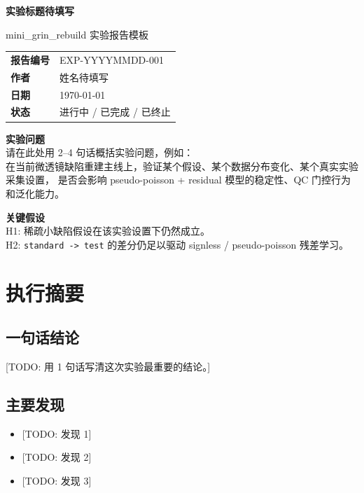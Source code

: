 \documentclass[UTF8,a4paper,11pt]{ctexart}
\newcommand{\ReportTitle}{实验标题待填写}
\newcommand{\ReportID}{EXP-YYYYMMDD-001}
\newcommand{\AuthorName}{姓名待填写}
\newcommand{\ReportDate}{\today}
\newcommand{\ExperimentStatus}{进行中 / 已完成 / 已终止}
\newcommand{\ProblemStatement}{%
请在此处用 2--4 句话概括实验问题，例如：\\
在当前微透镜缺陷重建主线上，验证某个假设、某个数据分布变化、某个真实实验采集设置，
是否会影响 pseudo-poisson + residual 模型的稳定性、QC 门控行为和泛化能力。%
}
\newcommand{\KeyHypothesis}{%
H1: 稀疏小缺陷假设在该实验设置下仍然成立。\\
H2: \Code{standard -> test} 的差分仍足以驱动 signless / pseudo-poisson 残差学习。%
}
\newcommand{\TODO}[1]{\textcolor{red!70!black}{[TODO: #1]}}
\newcommand{\Code}[1]{\texttt{#1}}
\begin{document}
\begin{titlepage}
  \centering
  {\LARGE \bfseries \ReportTitle \par}
  \vspace{1.2em}
  {\large mini\_grin\_rebuild 实验报告模板 \par}
  \vspace{2em}

  \begin{tabular}{>{\bfseries}p{} p{}}
    报告编号 & \ReportID \\
    作者 & \AuthorName \\
    日期 & \ReportDate \\
    状态 & \ExperimentStatus \\
  \end{tabular}

  \vfill

  \begin{minipage}{0.92\textwidth}
    \textbf{实验问题} \\
    \ProblemStatement
  \end{minipage}

  \vspace{1.2em}

  \begin{minipage}{0.92\textwidth}
    \textbf{关键假设} \\
    \KeyHypothesis
  \end{minipage}

  \vfill
\end{titlepage}

\tableofcontents
\newpage

\section{执行摘要}

\subsection{一句话结论}
\TODO{用 1 句话写清这次实验最重要的结论。}

\subsection{主要发现}
\begin{itemize}
  \item \TODO{发现 1}
  \item \TODO{发现 2}
  \item \TODO{发现 3}
\end{itemize}
\end{document}
